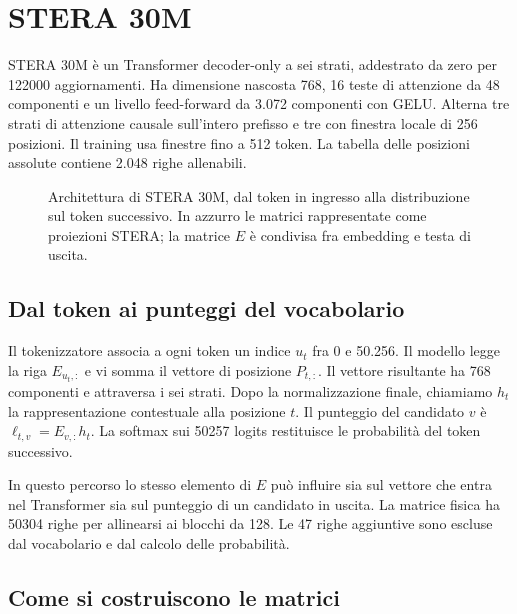 \section{STERA 30M}
\label{sec:architettura-stera30m}

STERA 30M è un Transformer decoder-only a sei strati, addestrato da zero per \num{122000} aggiornamenti. Ha dimensione nascosta 768, 16 teste di attenzione da 48 componenti e un livello feed-forward da 3.072 componenti con GELU. Alterna tre strati di attenzione causale sull'intero prefisso e tre con finestra locale di 256 posizioni. Il training usa finestre fino a 512 token. La tabella delle posizioni assolute contiene 2.048 righe allenabili.

\begin{figure}[htbp]
\centering
\resizebox{.92\linewidth}{!}{}
\caption{Architettura di STERA 30M, dal token in ingresso alla distribuzione sul token successivo. In azzurro le matrici rappresentate come proiezioni STERA; la matrice $E$ è condivisa fra embedding e testa di uscita.}
\label{fig:stera30m-flusso}
\end{figure}

\subsection{Dal token ai punteggi del vocabolario}

Il tokenizzatore associa a ogni token un indice $u_t$ fra 0 e 50.256. Il modello legge la riga $E_{u_t,:}$ e vi somma il vettore di posizione $P_{t,:}$. Il vettore risultante ha 768 componenti e attraversa i sei strati. Dopo la normalizzazione finale, chiamiamo $h_t$ la rappresentazione contestuale alla posizione $t$. Il punteggio del candidato $v$ è $\ell_{t,v}=E_{v,:}h_t$. La softmax sui \num{50257} logits restituisce le probabilità del token successivo.

In questo percorso lo stesso elemento di $E$ può influire sia sul vettore che entra nel Transformer sia sul punteggio di un candidato in uscita. La matrice fisica ha \num{50304} righe per allinearsi ai blocchi da 128. Le 47 righe aggiuntive sono escluse dal vocabolario e dal calcolo delle probabilità.

\subsection{Come si costruiscono le matrici}

